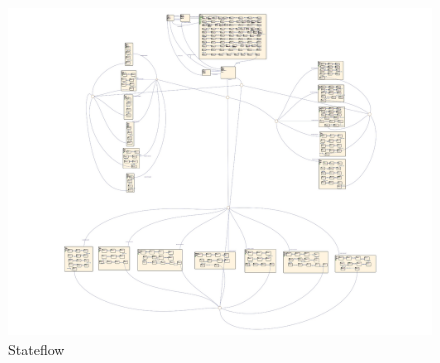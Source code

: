 \documentclass{report}
\begin{document}
\begin{figure}[h]
    \centering
    \includegraphics[width=1.0\linewidth]{images/Cube_actuator/state_flow.png}
    \caption{Stateflow}
    \label{fig:sta-flo}
\end{figure}
\end{document}
